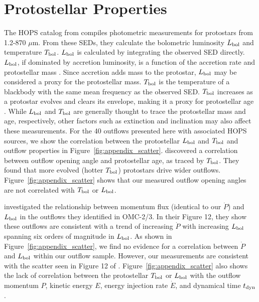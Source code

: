 \documentclass[twocolumn]{aastex63}
\begin{document}




\appendix
\section{Protostellar Properties}
The HOPS catalog from \citet{Furlan16} compiles photometric measurements for protostars from 1.2-870 $\mu$m. From these SEDs, they calculate the bolometric luminosity $L_{\rm bol}$ and temperature $T_{\rm bol}$. $L_{\rm bol}$ is calculated by integrating the observed SED directly. $L_{\rm bol}$, if dominated by accretion luminosity, is a function of the accretion rate and protostellar mass \citep{Takahashi08}. Since accretion adds mass to the protostar, $L_{\rm bol}$ may be considered a proxy for the protostellar mass. $T_{\rm bol}$ is the temperature of a blackbody with the same mean frequency as the observed SED. $T_{\rm bol}$ increases as a protostar evolves and clears its envelope, making it a proxy for protostellar age \citep{Myers93}. While $L_{\rm bol}$ and $T_{\rm bol}$ are generally thought to trace the protostellar mass and age, respectively, other factors such as extinction and inclination may also affect these measurements. For the 40 outflows presented here with associated HOPS sources, we show the correlation between the protostellar $L_{\rm bol}$ and $T_{\rm bol}$ and outflow properties in Figure~\ref{fig:appendix_scatter}. \citet{Arce06} discovered a correlation between outflow opening angle and protostellar age, as traced by $T_{\rm bol}$. They found that more evolved (hotter $T_{\rm bol}$) protostars drive wider outflows. Figure~\ref{fig:appendix_scatter} shows that our measured outflow opening angles are not correlated with $T_{\rm bol}$ or $L_{\rm bol}$.

\citet{Takahashi08} investigated the relationship between momentum flux (identical to our $\dot P$) and $L_{\rm bol}$ in the outflows they identified in OMC-2/3. In their Figure 12, they show these outflows are consistent with a trend of increasing $\dot P$ with increasing $L_{\rm bol}$ spanning six orders of magnitude in $L_{\rm bol}$. As shown in Figure~\ref{fig:appendix_scatter}, we find no evidence for a correlation between $\dot P$ and $L_{\rm bol}$ within our outflow sample. However, our measurements are consistent with the scatter seen in Figure 12 of \citet{Takahashi08}. Figure~\ref{fig:appendix_scatter} also shows the lack of correlation between the protostellar $T_{\rm bol}$ or $L_{\rm bol}$ with the outflow momentum $P$, kinetic energy $E$, energy injection rate $\dot E$, and dynamical time $t_{\rm dyn}$.
\end{document}
